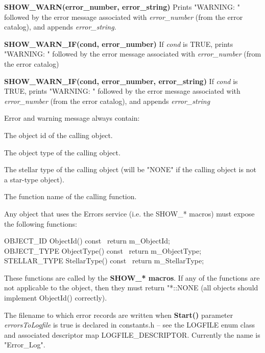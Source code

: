 \medskip
\textbf{SHOW\_WARN(error\_number, error\_string)}
Prints "WARNING: " followed by the error message associated with \textit{error\_number} (from the error catalog), and appends \textit{error\_string}.

\medskip
\textbf{SHOW\_WARN\_IF(cond, error\_number)}
If \textit{cond} is TRUE, prints "WARNING: " followed by the error message associated with \textit{error\_number} (from the error catalog)

\medskip
\textbf{SHOW\_WARN\_IF(cond, error\_number, error\_string)}
If \textit{cond} is TRUE, prints "WARNING: " followed by the error message associated with \textit{error\_number} (from the error catalog), and appends \textit{error\_string}

\bigskip
Error and warning message always contain:

\hfill
\begin{minipage}{\dimexpr\textwidth-2em}

    The object id of the calling object.

    The object type of the calling object.

    The stellar type of the calling object (will be "NONE" if the calling object is not a star-type  object).

    The function name of the calling function.
    
\end{minipage}

\bigskip
Any object that uses the Errors service (i.e. the SHOW\_* macros) must expose the following functions:


\tabto{3em}OBJECT\_ID  ObjectId() const \lcb\ return m\_ObjectId;\ \rcb \\
\tabto{3em}OBJECT\_TYPE ObjectType() const \lcb\ return m\_ObjectType;\ \rcb \\
\tabto{3em}STELLAR\_TYPE StellarType() const \lcb\ return m\_StellarType;\ \rcb

These functions are called by the \textbf{SHOW\_* macros}.  If any of the functions are not applicable to the object, then they must return "*::NONE (all objects should implement ObjectId() correctly).

\medskip
The filename to which error records are written when \textbf{Start()} parameter \textit{errorsToLogfile} is true is declared in constants.h -- see the LOGFILE enum class and associated descriptor map LOGFILE\_DESCRIPTOR. Currently the name is "Error\_Log".

